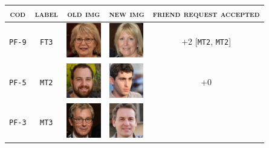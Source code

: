 \begin{center}
\begin{tabular}[c]{ |c|c|m{1.5cm}|m{1.5cm}|c| } 
	\hline
	\cellcolor[HTML]{b0d7ff}\textsc{cod} & 
	\cellcolor[HTML]{b0d7ff}\textsc{label} & 
	\multicolumn{1}{|c|}{\cellcolor[HTML]{b0d7ff}\textsc{old img}}&
	\multicolumn{1}{|c|}{\cellcolor[HTML]{b0d7ff}\textsc{new img}}&
	\cellcolor[HTML]{b0d7ff}\textsc{friend request accepted}\\
	\hline 
	\cellcolor[HTML]{b0d7ff}\texttt{PF-9}
	&\cellcolor[HTML]{e6f2ff}\texttt{FT3}
	&\vspace{.15cm}	\includegraphics[height=1.5cm]{immagini/FT3.jpg}
	&\vspace{.15cm}	\includegraphics[height=1.5cm]{immagini/FT3-new.jpg}
	& +2 [\texttt{MT2}, \texttt{MT2}]\\	 
	\hline 		
	\cellcolor[HTML]{b0d7ff}\texttt{PF-5}
	&\cellcolor[HTML]{e6f2ff}\texttt{MT2}
	&\vspace{.15cm}	\includegraphics[height=1.5cm]{immagini/MT2.jpg}
	&\vspace{.15cm}	\includegraphics[height=1.5cm]{immagini/MT2-new.jpg}
	& +0 \\
	\hline
	\cellcolor[HTML]{b0d7ff}\texttt{PF-3}
	&\cellcolor[HTML]{e6f2ff}\texttt{MT3}
	&\vspace{.15cm}	\includegraphics[height=1.5cm]{immagini/MT3.jpg}
	&\vspace{.15cm}	\includegraphics[height=1.5cm]{immagini/MT3-new.jpg}

\end{tabular}
\end{center}
